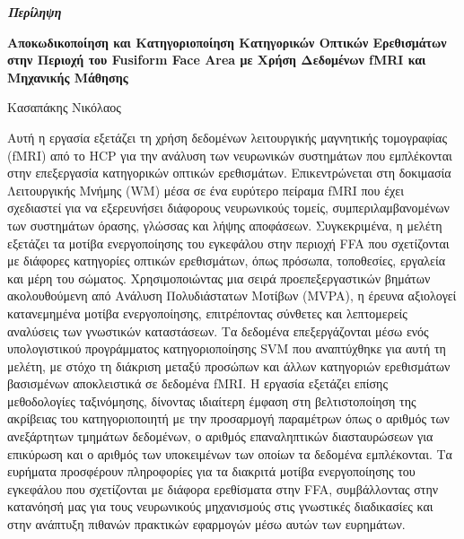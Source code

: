 \thispagestyle{plain}
\vspace*{\fill}
\begin{center}
    \LARGE
    \textit{\textbf{Περίληψη}}
        
    \vspace{0.4cm}
    \large
    \textbf{Αποκωδικοποίηση και Κατηγοριοποίηση Κατηγορικών Οπτικών Ερεθισμάτων στην Περιοχή του Fusiform Face Area με Χρήση Δεδομένων fMRI και Μηχανικής Μάθησης}
        
    \vspace{0.4cm}
    Κασαπάκης Νικόλαος
\end{center}
\normalsize

\vspace{0.9cm}

Αυτή η εργασία εξετάζει τη χρήση δεδομένων λειτουργικής μαγνητικής τομογραφίας (\acrshort{fMRI}) από το \acrshort{HCP} για την ανάλυση των νευρωνικών συστημάτων που εμπλέκονται στην επεξεργασία κατηγορικών οπτικών ερεθισμάτων. Επικεντρώνεται στη δοκιμασία Λειτουργικής Μνήμης (\acrshort{WM}) μέσα σε ένα ευρύτερο πείραμα fMRI που έχει σχεδιαστεί για να εξερευνήσει διάφορους νευρωνικούς τομείς, συμπεριλαμβανομένων των συστημάτων όρασης, γλώσσας και λήψης αποφάσεων. Συγκεκριμένα, η μελέτη εξετάζει τα μοτίβα ενεργοποίησης του εγκεφάλου στην περιοχή \gls{FFA} που σχετίζονται με διάφορες κατηγορίες οπτικών ερεθισμάτων, όπως πρόσωπα, τοποθεσίες, εργαλεία και μέρη του σώματος. Χρησιμοποιώντας μια σειρά προεπεξεργαστικών βημάτων ακολουθούμενη από Ανάλυση Πολυδιάστατων Μοτίβων (\acrshort{MVPA}), η έρευνα αξιολογεί κατανεμημένα μοτίβα ενεργοποίησης, επιτρέποντας σύνθετες και λεπτομερείς αναλύσεις των γνωστικών καταστάσεων. Τα δεδομένα επεξεργάζονται μέσω ενός υπολογιστικού προγράμμα\-τος κατηγοριοποίησης \acrshort{SVM} που αναπτύχθηκε για αυτή τη μελέτη, με στόχο τη διάκριση μεταξύ προσώπων και άλλων κατηγοριών ερεθισμάτων βασισμένων αποκλειστικά σε δεδομένα \acrshort{fMRI}. Η εργασία εξετάζει επίσης μεθοδολογίες ταξινόμησης, δίνοντας ιδιαίτερη έμφαση στη                                βελτιστοποίηση της ακρίβειας του κατηγοριοποιητή με την προσαρμογή παραμέτρων όπως ο αριθμός των ανεξάρτητων τμημάτων δεδομένων, ο αριθμός επαναληπτικών διασταυρώσεων για επικύρωση και ο αριθμός των υποκειμένων των οποίων τα δεδομένα εμπλέκονται. Τα ευρήματα προσφέρουν πληροφορίες για τα διακριτά μοτίβα ενεργοποίησης του εγκεφάλου που σχετίζονται με διάφορα ερεθίσματα στην \acrshort{FFA}, συμβάλλοντας στην κατανόησή μας για τους νευρωνικούς μηχανισμούς στις γνωστικές διαδικασίες και στην ανάπτυξη πιθανών πρακτικών εφαρμογών μέσω αυτών των ευρημάτων.

\vspace*{\fill}

